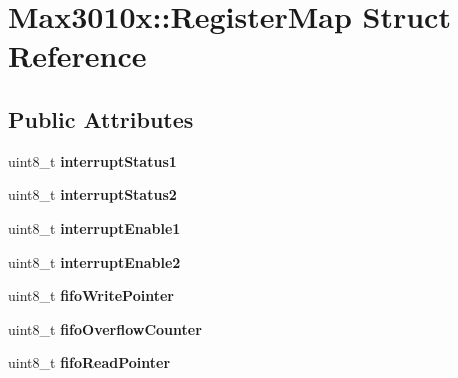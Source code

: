 \hypertarget{struct_max3010x_1_1_register_map}{}\section{Max3010x\+:\+:Register\+Map Struct Reference}
\label{struct_max3010x_1_1_register_map}
\subsection*{Public Attributes}
\begin{DoxyCompactItemize}
\item 
\hypertarget{struct_max3010x_1_1_register_map_ac5c98339e22358570645b90c9608c632}{}uint8\+\_\+t {\bfseries interrupt\+Status1}\label{struct_max3010x_1_1_register_map_ac5c98339e22358570645b90c9608c632}

\item 
\hypertarget{struct_max3010x_1_1_register_map_a8f18fbae3f4b968ef4e9b68bc7ad544f}{}uint8\+\_\+t {\bfseries interrupt\+Status2}\label{struct_max3010x_1_1_register_map_a8f18fbae3f4b968ef4e9b68bc7ad544f}

\item 
\hypertarget{struct_max3010x_1_1_register_map_aaed79fefdb3c19b3fd1576e2fa27b48e}{}uint8\+\_\+t {\bfseries interrupt\+Enable1}\label{struct_max3010x_1_1_register_map_aaed79fefdb3c19b3fd1576e2fa27b48e}

\item 
\hypertarget{struct_max3010x_1_1_register_map_a84f6cc239f36d33781d8ac3b46aec9c2}{}uint8\+\_\+t {\bfseries interrupt\+Enable2}\label{struct_max3010x_1_1_register_map_a84f6cc239f36d33781d8ac3b46aec9c2}

\item 
\hypertarget{struct_max3010x_1_1_register_map_a35772018b7d830955ef2a846893cee8b}{}uint8\+\_\+t {\bfseries fifo\+Write\+Pointer}\label{struct_max3010x_1_1_register_map_a35772018b7d830955ef2a846893cee8b}

\item 
\hypertarget{struct_max3010x_1_1_register_map_ae328c436371de4c06624a73f31cb3190}{}uint8\+\_\+t {\bfseries fifo\+Overflow\+Counter}\label{struct_max3010x_1_1_register_map_ae328c436371de4c06624a73f31cb3190}

\item 
\hypertarget{struct_max3010x_1_1_register_map_accb4653f171d5392939e12c9ad420c81}{}uint8\+\_\+t {\bfseries fifo\+Read\+Pointer}\label{struct_max3010x_1_1_register_map_accb4653f171d5392939e12c9ad420c81}


\end{DoxyCompactItemize}
